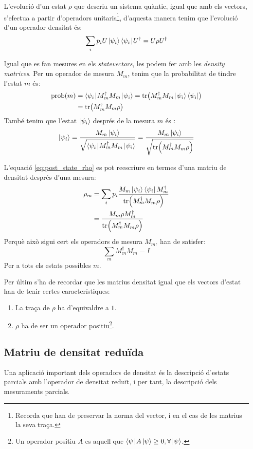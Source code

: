 L'evolució d'un estat $\rho$ que descriu un sistema quàntic, igual que amb els vectors, s'efectua a partir d'operadors unitaris\footnote{Recorda que han de preservar la norma del vector, i en el cas de les matrius la seva traça.}, d'aquesta manera tenim que l'evolució d'un operador densitat és:
$$
\sum_i p_i U \ket{\psi_i}\bra{\psi_i} U^\dagger = U\rho U^\dagger 
$$

Igual que es fan mesures en els \textit{statevectors}, les podem fer amb les \textit{density matrices}. Per un operador de mesura $M_m$, tenim que la probabilitat de tindre l'estat $m$ és:
\begin{align*}
	\mathrm{prob}(m) &= \bra{\psi_i}M_m^\dagger M_m\ket{\psi_i} = \tr(M_m^\dagger M_m \ket{\psi_i}\bra{\psi_i})\\ &= \tr(M_m^\dagger M_m \rho)
\end{align*}
També tenim que l'estat $\ket{\psi_i}$ després de la mesura $m$ és \cite{QCandQI:density_matrix}:
\begin{equation}
	\ket{\psi_i} = \frac{M_m\ket{\psi_i}}{\sqrt{\bra{\psi_i}M_m^\dagger M_m \ket{\psi_i}}} = \frac{M_m\ket{\psi_i}}{\sqrt{\tr(M_m^\dagger M_m \rho)}}
	\label{eq:post_state_rho}
\end{equation}

L'equació \ref{eq:post_state_rho} es pot reescriure en termes d'una matriu de densitat després d'una mesura:
\begin{align*}
	\rho_m &= \sum_i p_i \frac{M_m\ket{\psi_i}\bra{\psi_i}M_m^\dagger}{\tr(M_m^\dagger M_m \rho)} \\
	&= \frac{M_m\rho M_m^\dagger }{\tr(M_m^\dagger M_m\rho)}
\end{align*}
Perquè això sigui cert els operadors de mesura $M_m$, han de satisfer:
$$
\sum_m M_m^\dagger M_m = I
$$
Per a tots els estats possibles $m$.

Per últim s'ha de recordar que les matrius densitat igual que els vectors d'estat han de tenir certes característiques:
\begin{enumerate}
	\item La traça de $\rho$ ha d'equivaldre a $1$.
	\item $\rho$ ha de ser un operador positiu\footnote{Un operador positiu $A$ es aquell que $\bra{\psi}A\ket{\psi}\geq0, \forall \ket{\psi}$.}.
\end{enumerate}
\subsection{Matriu de densitat reduïda}
Una aplicació important dels operadors de densitat és la descripció d'estats parcials amb l'operador de densitat reduït, i per tant, la descripció dels mesuraments parcials.

